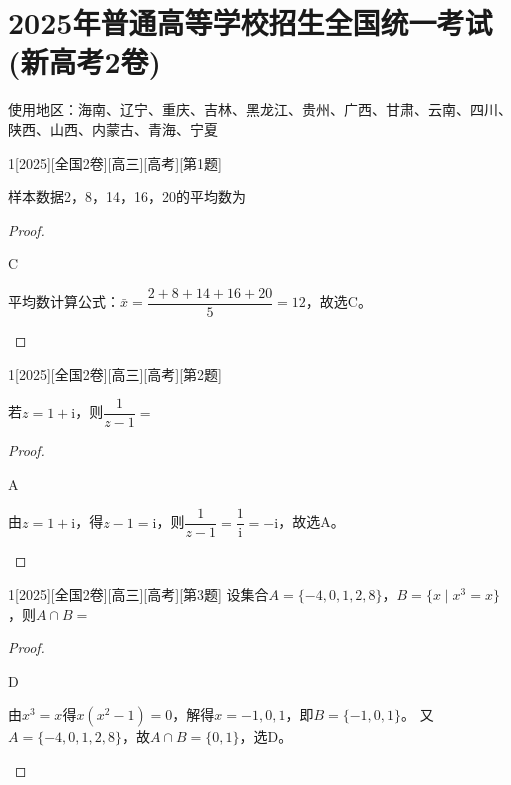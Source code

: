 \section*{2025年普通高等学校招生全国统一考试(新高考2卷)}
使用地区：海南、辽宁、重庆、吉林、黑龙江、贵州、广西、甘肃、云南、四川、陕西、山西、内蒙古、青海、宁夏\\
\begin{example}{1}[2025][全国2卷][高三][高考][第1题]

样本数据2，8，14，16，20的平均数为\blankbox
\begin{choices}
\end{choices}


\begin{proof}
	\begin{answer}
		C
	\end{answer}
	\begin{solutions}
		平均数计算公式：$\bar{x}=\dfrac{2+8+14+16+20}{5}=12$，故选C。
	\end{solutions}
\end{proof}
\end{example}

\begin{example}{1}[2025][全国2卷][高三][高考][第2题]

若$z=1+\text{i}$，则$\dfrac{1}{z-1}=$\blankbox
\begin{choices}
\end{choices}


\begin{proof}
	\begin{answer}
		A
	\end{answer}
	\begin{solutions}
		由$z=1+\text{i}$，得$z-1=\text{i}$，则$\dfrac{1}{z-1}=\dfrac{1}{\text{i}}=-\text{i}$，故选A。
	\end{solutions}
\end{proof}
\end{example}

\begin{example}{1}[2025][全国2卷][高三][高考][第3题]
设集合$A=\{-4,0,1,2,8\}$，$B=\{x\mid x^3=x\}$，则$A\cap B=$\blankbox
\begin{choices}
\end{choices}
\begin{proof}
	\begin{answer}
		D
	\end{answer}
	\begin{solutions}
		由$x^3=x$得$x(x^2-1)=0$，解得$x=-1,0,1$，即$B=\{-1,0,1\}$。
		又$A=\{-4,0,1,2,8\}$，故$A\cap B=\{0,1\}$，选D。
	\end{solutions}
\end{proof}
\end{example}

